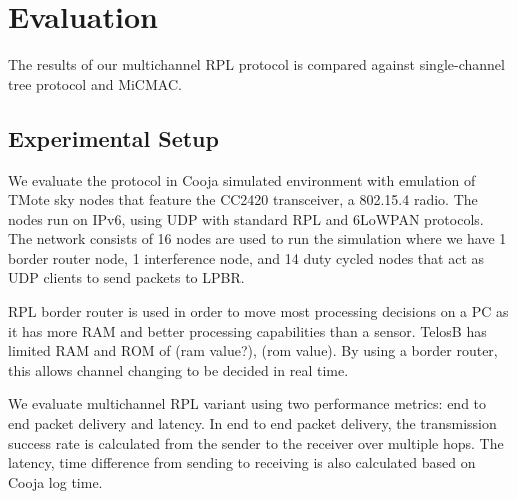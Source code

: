 \section{Evaluation}
The results of our multichannel RPL protocol is compared against single-channel tree protocol and MiCMAC.

\subsection{Experimental Setup}
We evaluate the protocol in Cooja simulated environment with emulation of TMote sky nodes that feature the CC2420 transceiver, a 802.15.4 radio. The nodes run on IPv6, using UDP with standard RPL and 6LoWPAN protocols. The network consists of 16 nodes are used to run the simulation where we have 1 border router node, 1 interference node, and 14 duty cycled nodes that act as UDP clients to send packets to LPBR.

RPL border router is used in order to move most processing decisions on a PC as it has more RAM and better processing capabilities than a sensor. TelosB has limited RAM and ROM of (ram value?), (rom value). By using a border router, this allows channel changing to be decided in real time. 





We evaluate multichannel RPL variant using two performance metrics: end to end packet delivery and latency. In end to end packet delivery, the transmission success rate is calculated from the sender to the receiver over multiple hops. The latency, time difference from sending to receiving is also calculated based on Cooja log time. %

